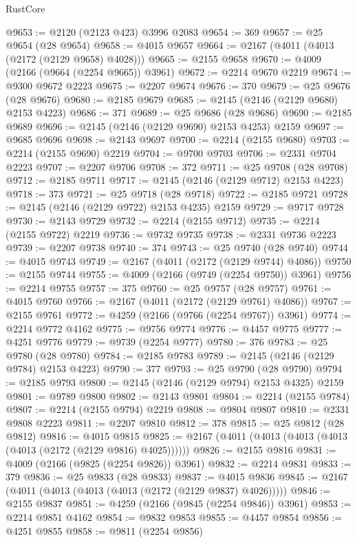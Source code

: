 \begin{lexlean}{RustCore}
\begin{coremodule}
@9653 := @2120 (@2123 @423) @3996 @2083
@9654 := 369
@9657 := @25 @9654 (@28 @9654)
@9658 := @4015 @9657
@9664 := @2167 (@4011 (@4013 (@2172 (@2129 @9658) @4028)))
@9665 := @2155 @9658
@9670 := @4009 (@2166 (@9664 (@2254 @9665)) @3961)
@9672 := @2214 @9670 @2219
@9674 := @9300 @9672 @2223
@9675 := @2207 @9674
@9676 := 370
@9679 := @25 @9676 (@28 @9676)
@9680 := @2185 @9679
@9685 := @2145 (@2146 (@2129 @9680) @2153 @4223)
@9686 := 371
@9689 := @25 @9686 (@28 @9686)
@9690 := @2185 @9689
@9696 := @2145 (@2146 (@2129 @9690) @2153 @4253) @2159
@9697 := @9685 @9696
@9698 := @2143 @9697
@9700 := @2214 (@2155 @9680)
@9703 := @2214 (@2155 @9690) @2219
@9704 := @9700 @9703
@9706 := @2331 @9704 @2223
@9707 := @2207 @9706
@9708 := 372
@9711 := @25 @9708 (@28 @9708)
@9712 := @2185 @9711
@9717 := @2145 (@2146 (@2129 @9712) @2153 @4223)
@9718 := 373
@9721 := @25 @9718 (@28 @9718)
@9722 := @2185 @9721
@9728 := @2145 (@2146 (@2129 @9722) @2153 @4235) @2159
@9729 := @9717 @9728
@9730 := @2143 @9729
@9732 := @2214 (@2155 @9712)
@9735 := @2214 (@2155 @9722) @2219
@9736 := @9732 @9735
@9738 := @2331 @9736 @2223
@9739 := @2207 @9738
@9740 := 374
@9743 := @25 @9740 (@28 @9740)
@9744 := @4015 @9743
@9749 := @2167 (@4011 (@2172 (@2129 @9744) @4086))
@9750 := @2155 @9744
@9755 := @4009 (@2166 (@9749 (@2254 @9750)) @3961)
@9756 := @2214 @9755
@9757 := 375
@9760 := @25 @9757 (@28 @9757)
@9761 := @4015 @9760
@9766 := @2167 (@4011 (@2172 (@2129 @9761) @4086))
@9767 := @2155 @9761
@9772 := @4259 (@2166 (@9766 (@2254 @9767)) @3961)
@9774 := @2214 @9772 @4162
@9775 := @9756 @9774
@9776 := @4457 @9775
@9777 := @4251 @9776
@9779 := @9739 (@2254 @9777)
@9780 := 376
@9783 := @25 @9780 (@28 @9780)
@9784 := @2185 @9783
@9789 := @2145 (@2146 (@2129 @9784) @2153 @4223)
@9790 := 377
@9793 := @25 @9790 (@28 @9790)
@9794 := @2185 @9793
@9800 := @2145 (@2146 (@2129 @9794) @2153 @4325) @2159
@9801 := @9789 @9800
@9802 := @2143 @9801
@9804 := @2214 (@2155 @9784)
@9807 := @2214 (@2155 @9794) @2219
@9808 := @9804 @9807
@9810 := @2331 @9808 @2223
@9811 := @2207 @9810
@9812 := 378
@9815 := @25 @9812 (@28 @9812)
@9816 := @4015 @9815
@9825 := @2167 (@4011 (@4013 (@4013 (@4013 (@4013 (@2172 (@2129 @9816) @4025))))))
@9826 := @2155 @9816
@9831 := @4009 (@2166 (@9825 (@2254 @9826)) @3961)
@9832 := @2214 @9831
@9833 := 379
@9836 := @25 @9833 (@28 @9833)
@9837 := @4015 @9836
@9845 := @2167 (@4011 (@4013 (@4013 (@4013 (@2172 (@2129 @9837) @4026)))))
@9846 := @2155 @9837
@9851 := @4259 (@2166 (@9845 (@2254 @9846)) @3961)
@9853 := @2214 @9851 @4162
@9854 := @9832 @9853
@9855 := @4457 @9854
@9856 := @4251 @9855
@9858 := @9811 (@2254 @9856)

\end{coremodule}
\end{lexlean}
